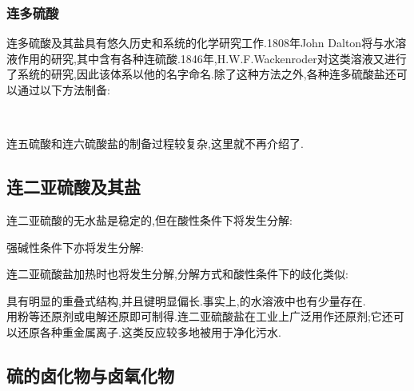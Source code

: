 \documentclass{ctexart}
\begin{document}
\subsubsection{连多硫酸}
连多硫酸及其盐具有悠久历史和系统的化学研究工作.1808年John Dalton将与水溶液作用的研究,其中含有各种连硫酸.1846年,H.W.F.Wackenroder对这类溶液又进行了系统的研究,因此该体系以他的名字命名.除了这种方法之外,各种连多硫酸盐还可以通过以下方法制备:
\begin{center}
    \\
\end{center}
连五硫酸和连六硫酸盐的制备过程较复杂,这里就不再介绍了.
\subsection{连二亚硫酸及其盐}
连二亚硫酸的无水盐是稳定的,但在酸性条件下将发生分解:
\begin{center}
\end{center}
强碱性条件下亦将发生分解:
\begin{center}
\end{center}
连二亚硫酸盐加热时也将发生分解,分解方式和酸性条件下的歧化类似:
\begin{center}
\end{center}
\indent {}具有明显的重叠式结构,并且键明显偏长.事实上,的水溶液中也有少量存在.\\
\indent 用粉等还原剂或电解还原即可制得.连二亚硫酸盐在工业上广泛用作还原剂;它还可以还原各种重金属离子.这类反应较多地被用于净化污水.
\subsection{硫的卤化物与卤氧化物}
\end{document}
